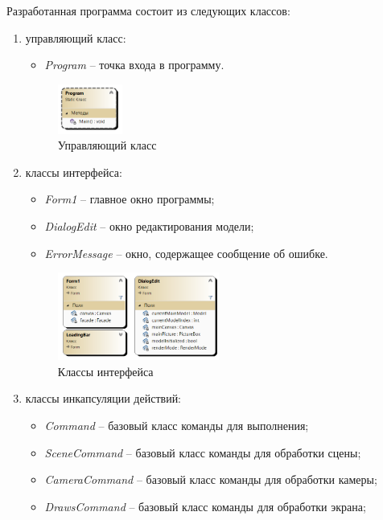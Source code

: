 Разработанная программа состоит из следующих классов:
\begin{enumerate}
	\item управляющий класс:
	\begin{itemize}[label=--]
		\item \textit{Program} -- точка входа в программу.
	\end{itemize}
	\begin{figure}[h] 
		\centering
		\includegraphics[width=0.2\textwidth]{images/main-class.png}
		\caption{Управляющий класс} 
		\label{fig:main-class} 
	\end{figure}
	\item классы интерфейса:
	\begin{itemize}[label=--]
		\item \textit{Form1} -- главное окно программы;
		\item \textit{DialogEdit} -- окно редактирования модели;
		\item \textit{ErrorMessage} -- окно, содержащее сообщение об ошибке.
	\end{itemize}
	\clearpage
	\begin{figure}[h] 
		\centering
		\includegraphics[width=0.5\textwidth]{images/interface-class.png}
		\caption{Классы интерфейса} 
		\label{fig:interface-class} 
	\end{figure}
	\item классы инкапсуляции действий:
	\begin{itemize}[label=--]
		\item \textit{Command} -- базовый класс команды для выполнения;
		\item \textit{SceneCommand} -- базовый класс команды для обработки сцены;
		\item \textit{CameraCommand} -- базовый класс команды для обработки камеры;
		\item \textit{DrawsCommand} -- базовый класс команды для обработки экрана;

\end{itemize}
\end{enumerate}
